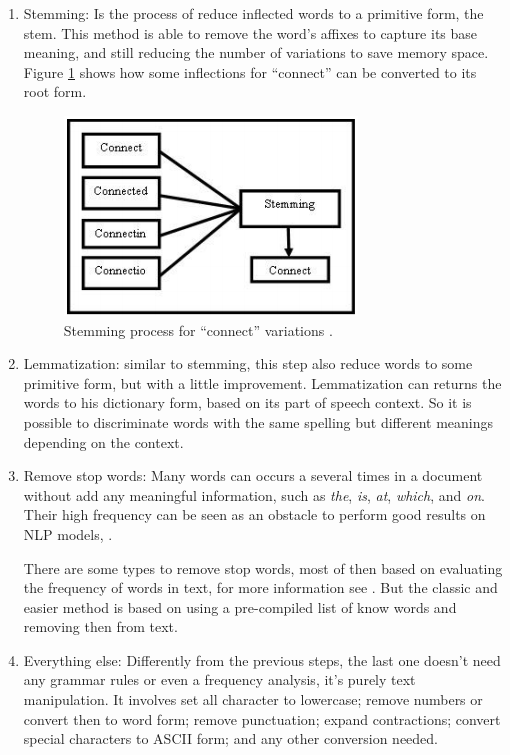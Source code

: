 	\begin{enumerate}
		\item Stemming: Is the process of reduce inflected words to a primitive form, the stem. This method is able to remove the word's affixes to capture its base meaning, and still reducing the number of variations to save memory space. Figure \ref{fig:stemming} shows how some inflections for ``connect'' can be converted to its root form.
		
		\begin{figure}[h!]
			\centering
			\includegraphics[width=0.45\linewidth]{01.Chapters/02.Background/stemming}
			\caption{Stemming process for ``connect'' variations \cite{vijayarani2015preprocessing}.}
			\label{fig:stemming}
		\end{figure}
		
		
		\item Lemmatization: similar to stemming, this step also reduce words to some primitive form, but with a little improvement. Lemmatization can returns the words to his dictionary form, based on its part of speech context. So it is possible to discriminate words with the same spelling but different meanings depending on the context. 	
		
		\item Remove stop words:
		Many words can occurs a several times in a document without add any meaningful information, such as \textit{the}, \textit{is}, \textit{at}, \textit{which}, and \textit{on}. Their high frequency can be seen as an obstacle to perform good results on NLP models, \cite{kannan2014preprocessing}. 
		
		There are some types to remove stop words, most of then based on evaluating the frequency of words in text, for more information see \cite{x}. But the classic and easier method is based on using a pre-compiled list of know words and removing then from text.
		
		\item Everything else:
		Differently from the previous steps, the last one doesn't need any grammar rules or even a frequency analysis, it's purely text manipulation. It involves set all character to lowercase; remove numbers or convert then to word form; remove punctuation; expand contractions; convert special characters to ASCII form; and any other conversion needed.		 	
	\end{enumerate}
	
